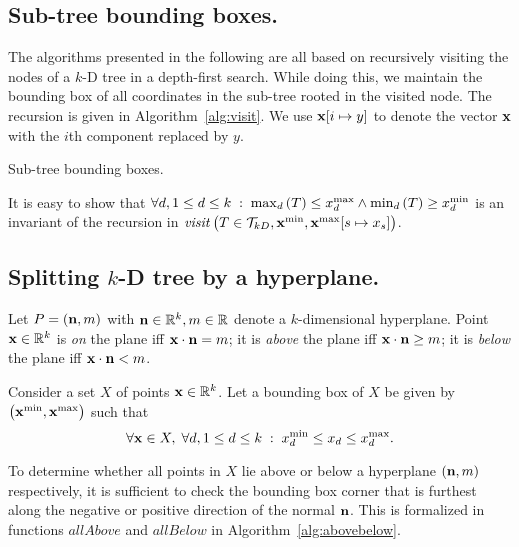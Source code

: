 \subsection{Sub-tree bounding boxes.}
The algorithms presented in the following are all based on recursively visiting the nodes of a $k$-D tree in a depth-first search.
While doing this, we maintain the bounding box of all coordinates in the sub-tree rooted in the visited node.
The recursion is given in Algorithm~\ref{alg:visit}.
We use $\vc{x}[i \mapsto y]$ to denote the vector $\vc{x}$ with the $i$th component replaced by $y$.
\begin{algorithm}[h]
  \DontPrintSemicolon
  \BlankLine
  \caption{Sub-tree bounding boxes.}
  \label{alg:visit}
\end{algorithm}

It is easy to show that $\forall d, 1 \leq d \leq k \;:\; \treemax[d]{T} \leq \xcmax{d} \AND \treemin[d]{T} \geq \xcmin{d}$
  is an invariant of the recursion in $\mathit{visit} \left( T \in \kdtrees, \xmin, \xmax[s \mapsto x_s] \right)$.


\subsection{Splitting $k$-D tree by a hyperplane.}
\label{sec:splitplane}
Let $P = \left( \vc{n}, m \right)$ with $\vc{n} \in \Real^k, m \in \Real$ denote a $k$-dimensional hyperplane.
Point $\vc{x} \in \Real^k$ is \emph{on} the plane iff $\vc{x}\cdot\vc{n} = m$;
it is \emph{above} the plane iff $\vc{x}\cdot\vc{n} \geq m$;
it is \emph{below} the plane iff $\vc{x}\cdot\vc{n} < m$.

Consider a set $X$ of points $\vc{x} \in \Real^k$.
Let a bounding box of $X$ be given by $\left( \xmin, \xmax \right)$ such that
\begin{displaymath}
  \forall \vc{x} \in X, \; \forall d, 1 \leq d \leq k \;:\; \xcmin{d} \leq x_d \leq \xcmax{d}.
\end{displaymath}

To determine whether all points in $X$ lie above or below a hyperplane $\left( \vc{n}, m \right)$ respectively,
it is sufficient to check the bounding box corner that is furthest along the negative or positive direction of the normal $\vc{n}$.
This is formalized in functions $\mathit{allAbove}$ and $\mathit{allBelow}$ in Algorithm~\ref{alg:abovebelow}.

